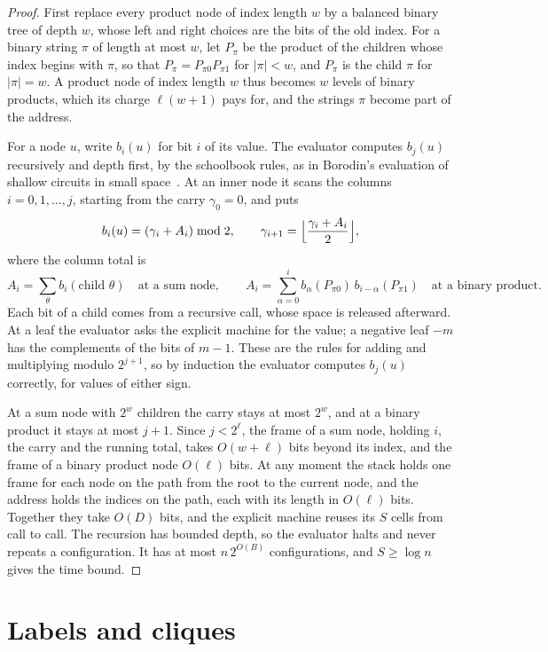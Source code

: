 \documentclass[11pt]{article}
\theoremstyle{definition}
\theoremstyle{definition}
\theoremstyle{remark}
\begin{document}
\begin{proof}
First replace every product node of index length $w$ by a balanced binary tree of depth $w$, whose left and right choices are the bits of the old index. For a binary string $\pi$ of length at most $w$, let $P_\pi$ be the product of the children whose index begins with $\pi$, so that $P_\pi=P_{\pi0}P_{\pi1}$ for $|\pi|<w$, and $P_\pi$ is the child $\pi$ for $|\pi|=w$. A product node of index length $w$ thus becomes $w$ levels of binary products, which its charge $\ell(w+1)$ pays for, and the strings $\pi$ become part of the address.

For a node $u$, write $b_i(u)$ for bit $i$ of its value. The evaluator computes $b_j(u)$ recursively and depth first, by the schoolbook rules, as in Borodin's evaluation of shallow circuits in small space~\cite{Bor77}. At an inner node it scans the columns $i=0,1,\dots,j$, starting from the carry $\gamma_0=0$, and puts
\[
b_i(u)=(\gamma_i+A_i)\bmod2,\qquad\gamma_{i+1}=\Bigl\lfloor\frac{\gamma_i+A_i}2\Bigr\rfloor,
\]
where the column total is
\[
A_i=\sum_\theta b_i(\text{child }\theta)\quad\text{at a sum node},\qquad A_i=\sum_{\alpha=0}^{i}b_\alpha(P_{\pi0})\,b_{i-\alpha}(P_{\pi1})\quad\text{at a binary product}.
\]
Each bit of a child comes from a recursive call, whose space is released afterward. At a leaf the evaluator asks the explicit machine for the value; a negative leaf $-m$ has the complements of the bits of $m-1$. These are the rules for adding and multiplying modulo $2^{j+1}$, so by induction the evaluator computes $b_j(u)$ correctly, for values of either sign.

At a sum node with $2^w$ children the carry stays at most $2^w$, and at a binary product it stays at most $j+1$. Since $j<2^\ell$, the frame of a sum node, holding $i$, the carry and the running total, takes $O(w+\ell)$ bits beyond its index, and the frame of a binary product node $O(\ell)$ bits. At any moment the stack holds one frame for each node on the path from the root to the current node, and the address holds the indices on the path, each with its length in $O(\ell)$ bits. Together they take $O(D)$ bits, and the explicit machine reuses its $S$ cells from call to call. The recursion has bounded depth, so the evaluator halts and never repeats a configuration. It has at most $n\,2^{O(B)}$ configurations, and $S\ge\log n$ gives the time bound.
\end{proof}

\section{Labels and cliques}\label{sec:labels}
\end{document}
